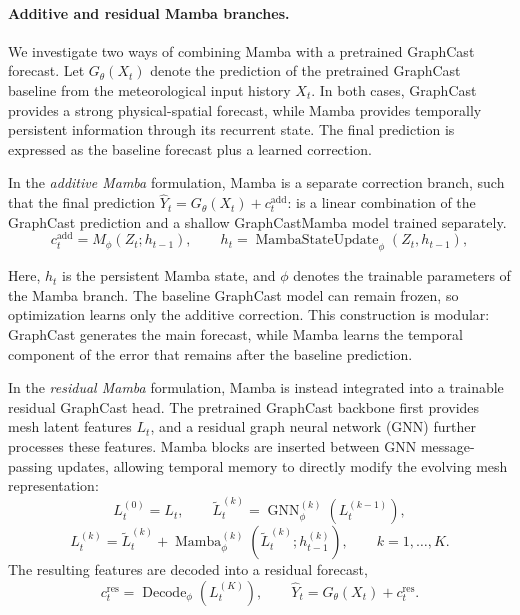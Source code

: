 \documentclass{article}
\begin{document}
\paragraph{Additive and residual Mamba branches.}
We investigate two ways of combining Mamba with a pretrained GraphCast forecast. Let $G_{\theta}(X_t)$ denote the prediction of the pretrained GraphCast baseline from the meteorological input history $X_t$. In both cases, GraphCast provides a strong physical-spatial forecast, while Mamba provides temporally persistent information through its recurrent state. The final prediction is expressed as the baseline forecast plus a learned correction.

In the \textit{additive Mamba} formulation, Mamba is a separate correction branch, such that the final prediction $\hat{Y}_t=G_{\theta}(X_t)+c_t^{\mathrm{add}}$: is a linear combination of the GraphCast prediction and a shallow GraphCastMamba model trained separately.
\begin{equation}
    c_t^{\mathrm{add}}
    =
    M_{\phi}(Z_t;h_{t-1}),
    \qquad
    h_t
    =
    \operatorname{MambaStateUpdate}_{\phi}(Z_t,h_{t-1}),
\end{equation}

Here, $h_t$ is the persistent Mamba state, and $\phi$ denotes the trainable parameters of the Mamba branch. The baseline GraphCast model can remain frozen, so optimization learns only the additive correction. This construction is modular: GraphCast generates the main forecast, while Mamba learns the temporal component of the error that remains after the baseline prediction.

In the \textit{residual Mamba} formulation, Mamba is instead integrated into a trainable residual GraphCast head. The pretrained GraphCast backbone first provides mesh latent features $L_t$, and a residual graph neural network (GNN) further processes these features. Mamba blocks are inserted between GNN message-passing updates, allowing temporal memory to directly modify the evolving mesh representation:
\begin{equation}
    L_t^{(0)} = L_t,
    \qquad
    \widetilde{L}_t^{(k)}
    =
    \operatorname{GNN}^{(k)}_{\phi}
    \left(L_t^{(k-1)}\right),
\end{equation}
\begin{equation}
    L_t^{(k)}
    =
    \widetilde{L}_t^{(k)}
    +
    \operatorname{Mamba}^{(k)}_{\phi}
    \left(\widetilde{L}_t^{(k)};h_{t-1}^{(k)}\right),
    \qquad k=1,\ldots,K.
\end{equation}
The resulting features are decoded into a residual forecast,
\begin{equation}
    c_t^{\mathrm{res}}
    =
    \operatorname{Decode}_{\phi}\left(L_t^{(K)}\right),
    \qquad
    \hat{Y}_t
    =
    G_{\theta}(X_t)
    +
    c_t^{\mathrm{res}}.
\end{equation}
\end{document}
